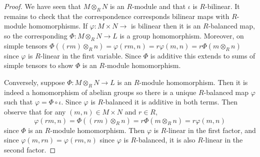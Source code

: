\begin{proof}
    We have seen that $M\otimes_RN$ is an $R$-module and that $\iota$ is $R$-bilinear. It remains to check that the correspondence corresponds bilinear maps with $R$-module homomorphisms. If $\varphi:M\times N\rightarrow$ is bilinear then it is an $R$-balanced map, so the corresponding $\Phi:M\otimes_RN\rightarrow L$ is a group homomorphism. Moreover, on simple tensors $\Phi((rm)\otimes_Rn) = \varphi(rm,n) = r\varphi(m,n) = r\Phi(m\otimes_Rn)$ since $\varphi$ is $R$-linear in the first variable. Since $\Phi$ is additive this extends to sums of simple tensors to show $\Phi$ is an $R$-module homomorphism.

    Conversely, suppose $\Phi:M\otimes_RN\rightarrow L$ is an $R$-module homomorphism. Then it is indeed a homomorphism of abelian groups so there is a unique $R$-balanced map $\varphi$ such that $\varphi = \Phi\circ \iota$. Since $\varphi$ is $R$-balanced it is additive in both terms. Then observe that for any $(m,n) \in M\times N$ and $r \in R$, \begin{equation*}
        \varphi(rm,n) = \Phi((rm)\otimes_Rn) = r\Phi(m\otimes_Rn) = r\varphi(m,n)
    \end{equation*}
    since $\Phi$ is an $R$-module homomorphism. Then $\varphi$ is $R$-linear in the first factor, and since $\varphi(m,rn) = \varphi(rm,n)$ since $\varphi$ is $R$-balanced, it is also $R$-linear in the second factor.
\end{proof}


